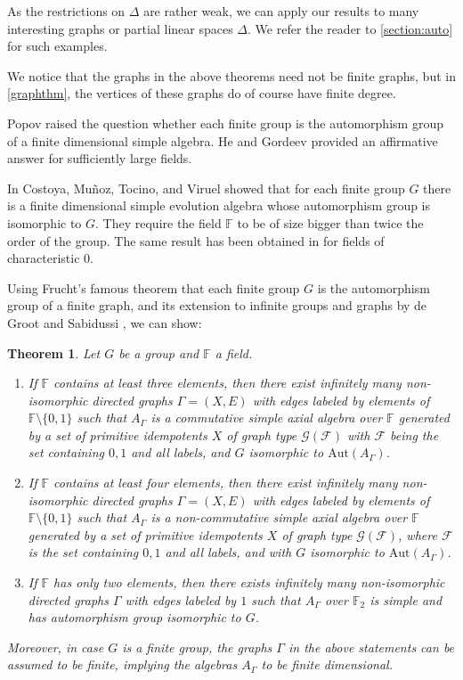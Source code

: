 \documentclass[oneside,a4paper]{amsart} %
\newtheorem{theorem}[proposition]{Theorem}
\theoremstyle{definition}
\begin{document}
As the restrictions on $\Delta$ are rather weak, we can apply our results to many interesting graphs or partial linear spaces $\Delta$.
We refer the reader to \cref{section:auto} for such examples.


We notice that the graphs in the above theorems need not be finite graphs, but in \cref{graphthm}, the vertices of these graphs do of course have finite degree.


Popov \cite{popov} raised the question whether each finite group is the automorphism group of a finite dimensional
simple algebra. He and Gordeev \cite{gordeev} provided an affirmative answer for sufficiently large  fields.

In \cite{evolution} Costoya, Mu\~{n}oz, Tocino, and Viruel showed that for each finite group $G$ there is a finite dimensional simple evolution algebra
whose automorphism group is isomorphic to $G$. They require the field $\mathbb{F}$ to be of size bigger than twice the order of the group.
The same result has been obtained in \cite{evolution2} for fields of characteristic $0$.

Using Frucht's famous theorem \cite{frucht39,frucht49} that   each finite group $G$ is the automorphism group of a finite graph,
and its extension to infinite groups and graphs by de Groot \cite{groot} and Sabidussi \cite{sabidussi2}, we can show:

\begin{theorem}\label{groupthm}
Let $G$ be a  group and $\mathbb{F}$ a field.
\begin{enumerate}
\item If $\mathbb{F}$ contains at least three elements, then
there exist infinitely many non-isomorphic  directed graphs $\Gamma=(X,E)$ with edges labeled by elements of $\mathbb{F}\setminus\{0,1\}$
such that $A_\Gamma$ is a commutative simple axial  algebra over $\mathbb{F}$ generated by a set of primitive idempotents $X$
of graph type $\mathcal{G}(\mathcal{F})$ with $\mathcal{F}$ being the set containing $0,1$ and all labels, and  $G$ isomorphic to $\mathrm{Aut}(A_\Gamma)$.
\item
If $\mathbb{F}$ contains at least four elements, then there exist infinitely many non-isomorphic  directed graphs $\Gamma=(X,E)$ with edges labeled by elements of $\mathbb{F}\setminus \{0,1\}$
such that $A_\Gamma$ is a  non-commutative simple  axial algebra over $\mathbb{F}$ generated by a set of primitive idempotents $X$
of graph type $\mathcal{G}(\mathcal{F})$, where $\mathcal{F}$ is the set containing $0,1$ and all labels, and  with $G$ isomorphic to $\mathrm{Aut}(A_\Gamma)$.
\item
If $\mathbb{F}$ has only two elements, then there exists infinitely many non-isomorphic directed graphs $\Gamma$ with edges labeled by $1$ such that $A_\Gamma$ over $\mathbb{F}_2$ is simple and has automorphism group isomorphic to $G$.
\end{enumerate}
Moreover, in case $G$ is a finite group, the graphs $\Gamma$ in the above statements can be assumed to be finite, implying the  algebras $A_\Gamma$ to be finite dimensional. 
\end{theorem}
\end{document}
